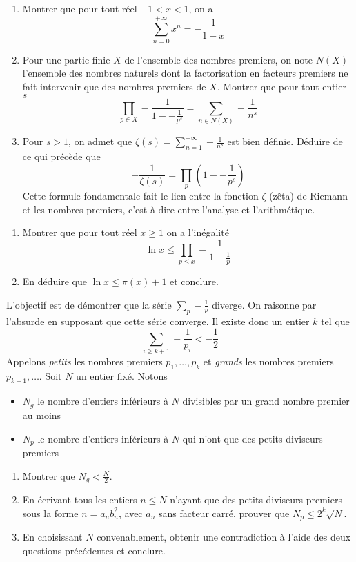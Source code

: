 \begin{exo}
\begin{enumerate}
\item Montrer que pour tout réel $-1 < x < 1$, on a
$$\displaystyle\sum_{n=0}^{+\infty} x^n = - \frac 1{1-x}$$
\item Pour une partie finie $X$ de l'ensemble des nombres premiers, on note $N(X)$ l'ensemble des nombres naturels dont la factorisation en facteurs premiers ne fait intervenir que des nombres premiers de $X$. Montrer que pour tout entier $s$
$$\prod_{p \in X} - \frac 1{1-- \frac 1{p^s}} = \sum_{n \in N(X)} - \frac 1{n^s}$$
\item Pour $s > 1$, on admet que $\zeta(s) = \displaystyle\sum_{n=1}^{+\infty} - \frac 1{n^s}$ est bien définie. Déduire de ce qui précède que
$$- \frac 1{\zeta(s)} = \prod_p \left(1-- \frac 1{p^s}\right)$$
Cette formule fondamentale fait le lien entre la fonction $\zeta$ (\og zêta\fg) de Riemann et les nombres premiers, c'est-à-dire entre l'analyse et l'arithmétique.
\end{enumerate}
\end{exo}


\begin{exo}
\begin{enumerate}
\item Montrer que pour tout réel $x \ge 1$ on a l'inégalité
$$\ln x \le \prod_{p \le x} - \frac 1{1 - \frac 1p}$$
\item En déduire que $\ln x \le \pi(x) + 1$ et conclure.
\end{enumerate}
\end{exo}


\begin{exo}
L'objectif est de démontrer que la série $\displaystyle\sum_p - \frac 1p$ diverge. On raisonne par l'absurde en supposant que cette série converge. Il existe donc un entier $k$ tel que
$$\sum_{i \ge k+1} - \frac 1{p_i} < - \frac 1{2}$$
Appelons \textit{petits} les nombres premiers $p_1, \dots, p_k$ et \textit{grands} les nombres premiers $p_{k+1}, \dots$. Soit $N$ un entier fixé. Notons
\begin{itemize}
\item $N_g$ le nombre d'entiers inférieurs à $N$ divisibles par un grand nombre premier au moins
\item $N_p$ le nombre d'entiers inférieurs à $N$ qui n'ont que des petits diviseurs premiers
\end{itemize}
\begin{enumerate}
\item Montrer que $N_g < \frac{N}{2}$.
\item En écrivant tous les entiers $n \le N$ n'ayant que des petits diviseurs premiers sous la forme $n = a_nb_n^2$, avec $a_n$ sans facteur carré, prouver que $N_p \le 2^k \sqrt N$.
\item En choisissant $N$ convenablement, obtenir une contradiction à l'aide des deux questions précédentes et conclure.
\end{enumerate}
\end{exo}


